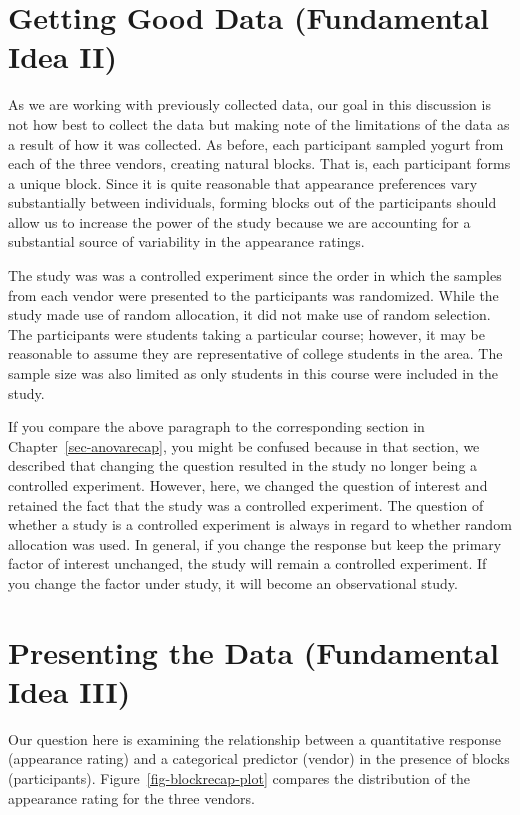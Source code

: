 \documentclass[
  letterpaper,
  DIV=11,
  numbers=noendperiod]{scrreprt}
\theoremstyle{plain}
\theoremstyle{definition}
\theoremstyle{definition}
\theoremstyle{remark}
\begin{document}
\section{Getting Good Data (Fundamental Idea
II)}\label{getting-good-data-fundamental-idea-ii-2}

As we are working with previously collected data, our goal in this
discussion is not how best to collect the data but making note of the
limitations of the data as a result of how it was collected. As before,
each participant sampled yogurt from each of the three vendors, creating
natural blocks. That is, each participant forms a unique block. Since it
is quite reasonable that appearance preferences vary substantially
between individuals, forming blocks out of the participants should allow
us to increase the power of the study because we are accounting for a
substantial source of variability in the appearance ratings.

The study was was a controlled experiment since the order in which the
samples from each vendor were presented to the participants was
randomized. While the study made use of random allocation, it did not
make use of random selection. The participants were students taking a
particular course; however, it may be reasonable to assume they are
representative of college students in the area. The sample size was also
limited as only students in this course were included in the study.

If you compare the above paragraph to the corresponding section in
Chapter~\ref{sec-anovarecap}, you might be confused because in that
section, we described that changing the question resulted in the study
no longer being a controlled experiment. However, here, we changed the
question of interest and retained the fact that the study was a
controlled experiment. The question of whether a study is a controlled
experiment is always in regard to whether random allocation was used. In
general, if you change the response but keep the primary factor of
interest unchanged, the study will remain a controlled experiment. If
you change the factor under study, it will become an observational
study.

\section{Presenting the Data (Fundamental Idea
III)}\label{presenting-the-data-fundamental-idea-iii-2}

Our question here is examining the relationship between a quantitative
response (appearance rating) and a categorical predictor (vendor) in the
presence of blocks (participants). Figure~\ref{fig-blockrecap-plot}
compares the distribution of the appearance rating for the three
vendors.
\end{document}
